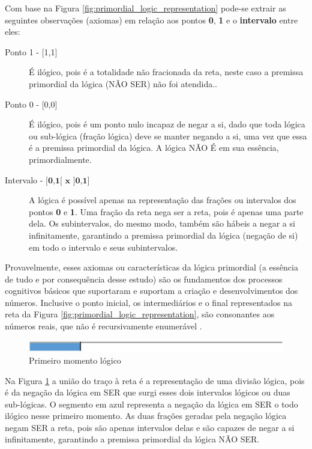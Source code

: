 Com base na Figura \ref{fig:primordial_logic_representation} pode-se extrair as seguintes observações (axiomas) em relação aos pontos \textbf{0}, \textbf{1} e o \textbf{intervalo} entre eles:
\begin{description}
   \item[Ponto 1 - {[1,1]}] É ilógico, pois é a totalidade não fracionada da reta, neste caso a premissa primordial da lógica (NÃO SER) não foi atendida..
   \item[Ponto 0 - {[0,0]}] É ilógico, pois é um ponto nulo incapaz de negar a si, dado que toda lógica ou sub-lógica (fração lógica) deve se manter negando a si, uma vez que essa é a premissa primordial da lógica. A lógica NÃO É em sua essência, primordialmente.
   \item[Intervalo - $\textbf{{[0,1[ x ]0,1]}}$] A lógica é possível apenas na representação das frações ou intervalos dos pontos \textbf{0} e \textbf{1}. Uma fração da reta nega ser a reta, pois é apenas uma parte dela. Os subintervalos, do mesmo modo, também são hábeis a negar a si infinitamente, garantindo a premissa primordial da lógica (negação de si) em todo o intervalo e seus subintervalos. 
\end{description}

Provavelmente, esses axiomas ou características da lógica primordial (a essência de tudo e por consequência desse estudo) são os fundamentos dos processos cognitivos básicos que suportaram e suportam a criação e desenvolvimentos dos números. Inclusive o ponto inicial, os intermediários e o final representados na reta da Figura \ref{fig:primordial_logic_representation}, são consonantes aos números reais, que não é recursivamente enumerável \cite{smb_numeros_reais}. 
\begin{figure}[H]
\caption{Primeiro momento lógico}
\label{fig:first_logical_moment}
\centering
\includegraphics[scale=1]{sections/images/first_logical_moment.jpg}
\end{figure}

Na Figura \ref{fig:first_logical_moment} a união do traço à reta é a representação de uma divisão lógica, pois é da negação da lógica em SER que surgi esses dois intervalos lógicos ou duas sub-lógicas. O segmento em azul representa a negação da lógica em SER o todo ilógico nesse primeiro momento. As duas frações geradas pela negação lógica negam SER a reta, pois são apenas intervalos delas e são capazes de negar a si infinitamente, garantindo a premissa primordial da lógica NÃO SER. 







